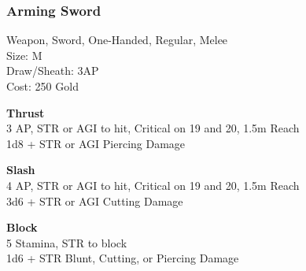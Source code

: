 \subsubsection{Arming Sword}\label{weapon:armingSword}
Weapon, Sword, One-Handed, Regular, Melee\\
Size: M\\
Draw/Sheath: 3AP\\
Cost: 250 Gold

\textbf{Thrust}\\
3 AP, STR or AGI to hit, Critical on 19 and 20, 1.5m Reach\\
1d8 + \texttimes STR or AGI Piercing Damage

\textbf{Slash}\\
4 AP, STR or AGI to hit, Critical on 19 and 20, 1.5m Reach\\
3d6 + \texttimes STR or AGI Cutting Damage

\textbf{Block}\\
5 Stamina, STR to block\\
1d6 + \texttimes STR Blunt, Cutting, or Piercing Damage
